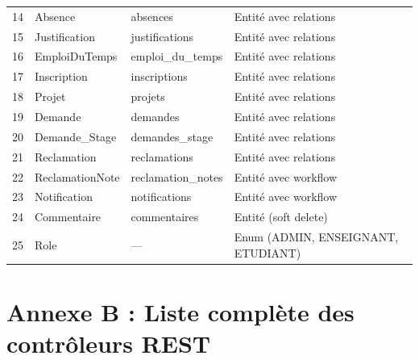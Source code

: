 \begin{longtable}{clll}
14 & Absence        & absences          & Entité avec relations \\
15 & Justification  & justifications    & Entité avec relations \\
16 & EmploiDuTemps  & emploi\_du\_temps & Entité avec relations \\
17 & Inscription    & inscriptions      & Entité avec relations \\
18 & Projet         & projets           & Entité avec relations \\
19 & Demande        & demandes          & Entité avec relations \\
20 & Demande\_Stage & demandes\_stage   & Entité avec relations \\
21 & Reclamation    & reclamations      & Entité avec relations \\
22 & ReclamationNote& reclamation\_notes& Entité avec workflow \\
23 & Notification   & notifications     & Entité avec workflow \\
24 & Commentaire    & commentaires      & Entité (soft delete) \\
25 & Role           & —                 & Enum (ADMIN, ENSEIGNANT, ETUDIANT) \\
\end{longtable}

\section*{Annexe B : Liste complète des contrôleurs REST}

